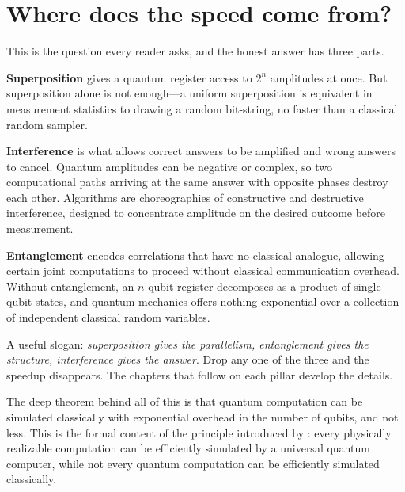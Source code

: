 \section{Where does the speed come from?}

This is the question every reader asks, and the honest answer has three parts.

\textbf{Superposition} gives a quantum register access to $2^n$ amplitudes at once. But superposition alone is not enough---a uniform superposition is equivalent in measurement statistics to drawing a random bit-string, no faster than a classical random sampler.

\textbf{Interference} is what allows correct answers to be amplified and wrong answers to cancel. Quantum amplitudes can be negative or complex, so two computational paths arriving at the same answer with opposite phases destroy each other. Algorithms are choreographies of constructive and destructive interference, designed to concentrate amplitude on the desired outcome before measurement.

\textbf{Entanglement} encodes correlations that have no classical analogue, allowing certain joint computations to proceed without classical communication overhead. Without entanglement, an $n$-qubit register decomposes as a product of single-qubit states, and quantum mechanics offers nothing exponential over a collection of independent classical random variables.

\begin{remark}
A useful slogan: \emph{superposition gives the parallelism, entanglement gives the structure, interference gives the answer}. Drop any one of the three and the speedup disappears. The chapters that follow on each pillar develop the details.
\end{remark}

The deep theorem behind all of this is that quantum computation can be simulated classically with exponential overhead in the number of qubits, and not less. This is the formal content of the  principle introduced by \citet{deutsch_quantum_1985}: every physically realizable computation can be efficiently simulated by a universal quantum computer, while not every quantum computation can be efficiently simulated classically.

